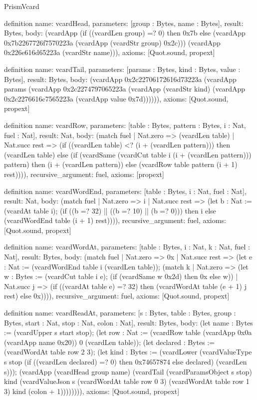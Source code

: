\begin{lexlean}{PrismVcard}
\begin{semanticmodule}
definition{
  name: vcardHead,
  parameters: [group : Bytes, name : Bytes],
  result: Bytes,
  body: (vcardApp (if ((vcardLen group) =? 0) then 0x7b else (vcardApp 0x7b2267726f7570223a (vcardApp (vcardStr group) 0x2c))) (vcardApp 0x226e616d65223a (vcardStr name))),
  axioms: [Quot.sound, propext]
}

definition{
  name: vcardTail,
  parameters: [params : Bytes, kind : Bytes, value : Bytes],
  result: Bytes,
  body: (vcardApp 0x2c22706172616d73223a (vcardApp params (vcardApp 0x2c2274797065223a (vcardApp (vcardStr kind) (vcardApp 0x2c2276616c7565223a (vcardApp value 0x7d)))))),
  axioms: [Quot.sound, propext]
}

definition{
  name: vcardRow,
  parameters: [table : Bytes, pattern : Bytes, i : Nat, fuel : Nat],
  result: Nat,
  body: (match fuel
    | Nat.zero => (vcardLen table)
    | Nat.succ rest => (if ((vcardLen table) <? (i + (vcardLen pattern))) then (vcardLen table) else (if (vcardSame (vcardCut table i (i + (vcardLen pattern))) pattern) then (i + (vcardLen pattern)) else (vcardRow table pattern (i + 1) rest)))),
  recursive_argument: fuel,
  axioms: [propext]
}

definition{
  name: vcardWordEnd,
  parameters: [table : Bytes, i : Nat, fuel : Nat],
  result: Nat,
  body: (match fuel
    | Nat.zero => i
    | Nat.succ rest => (let b : Nat := (vcardAt table i); (if ((b =? 32) || ((b =? 10) || (b =? 0))) then i else (vcardWordEnd table (i + 1) rest)))),
  recursive_argument: fuel,
  axioms: [Quot.sound, propext]
}

definition{
  name: vcardWordAt,
  parameters: [table : Bytes, i : Nat, k : Nat, fuel : Nat],
  result: Bytes,
  body: (match fuel
    | Nat.zero => 0x
    | Nat.succ rest => (let e : Nat := (vcardWordEnd table i (vcardLen table)); (match k
      | Nat.zero => (let w : Bytes := (vcardCut table i e); (if (vcardSame w 0x2d) then 0x else w))
      | Nat.succ j => (if ((vcardAt table e) =? 32) then (vcardWordAt table (e + 1) j rest) else 0x)))),
  recursive_argument: fuel,
  axioms: [Quot.sound, propext]
}

definition{
  name: vcardReadAt,
  parameters: [s : Bytes, table : Bytes, group : Bytes, start : Nat, stop : Nat, colon : Nat],
  result: Bytes,
  body: (let name : Bytes := (vcardUpper s start stop); (let row : Nat := (vcardRow table (vcardApp 0x0a (vcardApp name 0x20)) 0 (vcardLen table)); (let declared : Bytes := (vcardWordAt table row 2 3); (let kind : Bytes := (vcardLower (vcardValueType s stop (if ((vcardLen declared) =? 0) then 0x74657874 else declared) (vcardLen s))); (vcardApp (vcardHead group name) (vcardTail (vcardParamsObject s stop) kind (vcardValueJson s (vcardWordAt table row 0 3) (vcardWordAt table row 1 3) kind (colon + 1)))))))),
  axioms: [Quot.sound, propext]
}



\end{semanticmodule}
\end{lexlean}
